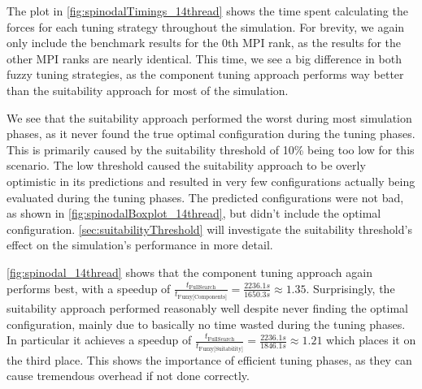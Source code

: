 The plot in \autoref{fig:spinodalTimings_14thread} shows the time spent calculating the forces for each tuning strategy throughout the simulation. For brevity, we again only include the benchmark results for the 0th MPI rank, as the results for the other MPI ranks are nearly identical. This time, we see a big difference in both fuzzy tuning strategies, as the component tuning approach performs way better than the suitability approach for most of the simulation.

We see that the suitability approach performed the worst during most simulation phases, as it never found the true optimal configuration during the tuning phases. This is primarily caused by the suitability threshold of 10\% being too low for this scenario. The low threshold caused the suitability approach to be overly optimistic in its predictions and resulted in very few configurations actually being evaluated during the tuning phases. The predicted configurations were not bad, as shown in \autoref{fig:spinodalBoxplot_14thread}, but didn't include the optimal configuration. \autoref{sec:suitabilityThreshold} will investigate the suitability threshold's effect on the simulation's performance in more detail.

\autoref{fig:spinodal_14thread} shows that the component tuning approach again performs best, with a speedup of $\frac{t_{\text{FullSearch}}}{t_{\text{Fuzzy[Components]}}} = \frac{2236.1s}{1650.3s} \approx 1.35$. Surprisingly, the suitability approach performed reasonably well despite never finding the optimal configuration, mainly due to basically no time wasted during the tuning phases. In particular it achieves a speedup of $\frac{t_{\text{FullSearch}}}{t_{\text{Fuzzy[Suitability]}}} = \frac{2236.1s}{1846.1s} \approx 1.21$ which places it on the third place. This shows the importance of efficient tuning phases, as they can cause tremendous overhead if not done correctly.

\newpage

